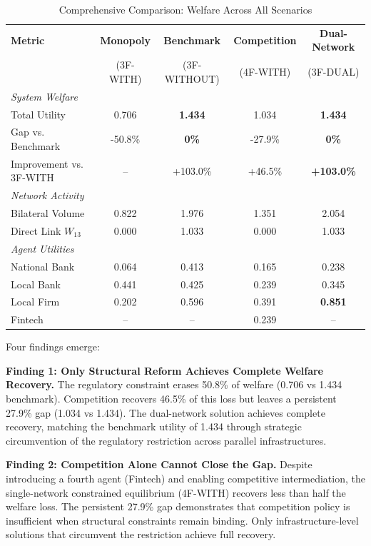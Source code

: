 \documentclass[12pt]{article}
\begin{document}
\begin{table}[h]
\centering
\caption{Comprehensive Comparison: Welfare Across All Scenarios}
\label{tab:master_comparison}
\begin{tabular}{lcccc}
\toprule
\textbf{Metric} & \textbf{Monopoly} & \textbf{Benchmark} & \textbf{Competition} & \textbf{Dual-Network} \\
 & (3F-WITH) & (3F-WITHOUT) & (4F-WITH) & (3F-DUAL) \\
\midrule
\textit{System Welfare} & & & & \\
\quad Total Utility & 0.706 & \textbf{1.434} & 1.034 & \textbf{1.434} \\
\quad Gap vs. Benchmark & -50.8\% & \textbf{0\%} & -27.9\% & \textbf{0\%} \\
\quad Improvement vs. 3F-WITH & -- & +103.0\% & +46.5\% & \textbf{+103.0\%} \\
\midrule
\textit{Network Activity} & & & & \\
\quad Bilateral Volume & 0.822 & 1.976 & 1.351 & 2.054 \\
\quad Direct Link $W_{13}$ & 0.000 & 1.033 & 0.000 & 1.033 \\
\midrule
\textit{Agent Utilities} & & & & \\
\quad National Bank & 0.064 & 0.413 & 0.165 & 0.238 \\
\quad Local Bank & 0.441 & 0.425 & 0.239 & 0.345 \\
\quad Local Firm & 0.202 & 0.596 & 0.391 & \textbf{0.851} \\
\quad Fintech & -- & -- & 0.239 & -- \\
\bottomrule
\end{tabular}
\end{table}

Four findings emerge:

\textbf{Finding 1: Only Structural Reform Achieves Complete Welfare Recovery.} The regulatory constraint erases 50.8\% of welfare (0.706 vs 1.434 benchmark). Competition recovers 46.5\% of this loss but leaves a persistent 27.9\% gap (1.034 vs 1.434). The dual-network solution achieves complete recovery, matching the benchmark utility of 1.434 through strategic circumvention of the regulatory restriction across parallel infrastructures.

\textbf{Finding 2: Competition Alone Cannot Close the Gap.} Despite introducing a fourth agent (Fintech) and enabling competitive intermediation, the single-network constrained equilibrium (4F-WITH) recovers less than half the welfare loss. The persistent 27.9\% gap demonstrates that competition policy is insufficient when structural constraints remain binding. Only infrastructure-level solutions that circumvent the restriction achieve full recovery.
\end{document}
